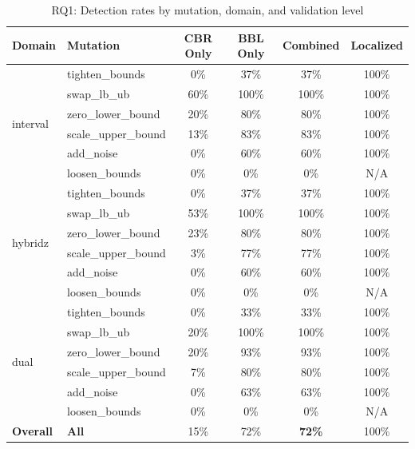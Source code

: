 \begin{table}[t]
\centering
\caption{RQ1: Detection rates by mutation, domain, and validation level}
\label{tab:rq1-detection}
\small
\setlength{\tabcolsep}{4pt}
\begin{tabular}{llcccc}
\toprule
\textbf{Domain} & \textbf{Mutation} & \textbf{CBR Only} & \textbf{BBL Only} & \textbf{Combined} & \textbf{Localized} \\
\midrule
\multirow{6}{*}{interval}
& tighten_bounds & 0\% & 37\% & 37\% & 100\% \\

& swap_lb_ub & 60\% & 100\% & 100\% & 100\% \\

& zero_lower_bound & 20\% & 80\% & 80\% & 100\% \\

& scale_upper_bound & 13\% & 83\% & 83\% & 100\% \\

& add_noise & 0\% & 60\% & 60\% & 100\% \\

& loosen_bounds & 0\% & 0\% & 0\% & N/A \\
\midrule
\multirow{6}{*}{hybridz}
& tighten_bounds & 0\% & 37\% & 37\% & 100\% \\

& swap_lb_ub & 53\% & 100\% & 100\% & 100\% \\

& zero_lower_bound & 23\% & 80\% & 80\% & 100\% \\

& scale_upper_bound & 3\% & 77\% & 77\% & 100\% \\

& add_noise & 0\% & 60\% & 60\% & 100\% \\

& loosen_bounds & 0\% & 0\% & 0\% & N/A \\
\midrule
\multirow{6}{*}{dual}
& tighten_bounds & 0\% & 33\% & 33\% & 100\% \\

& swap_lb_ub & 20\% & 100\% & 100\% & 100\% \\

& zero_lower_bound & 20\% & 93\% & 93\% & 100\% \\

& scale_upper_bound & 7\% & 80\% & 80\% & 100\% \\

& add_noise & 0\% & 63\% & 63\% & 100\% \\

& loosen_bounds & 0\% & 0\% & 0\% & N/A \\
\midrule
\textbf{Overall} & \textbf{All} & 15\% & 72\% & \textbf{72\%} & 100\% \\
\bottomrule
\end{tabular}
\end{table}